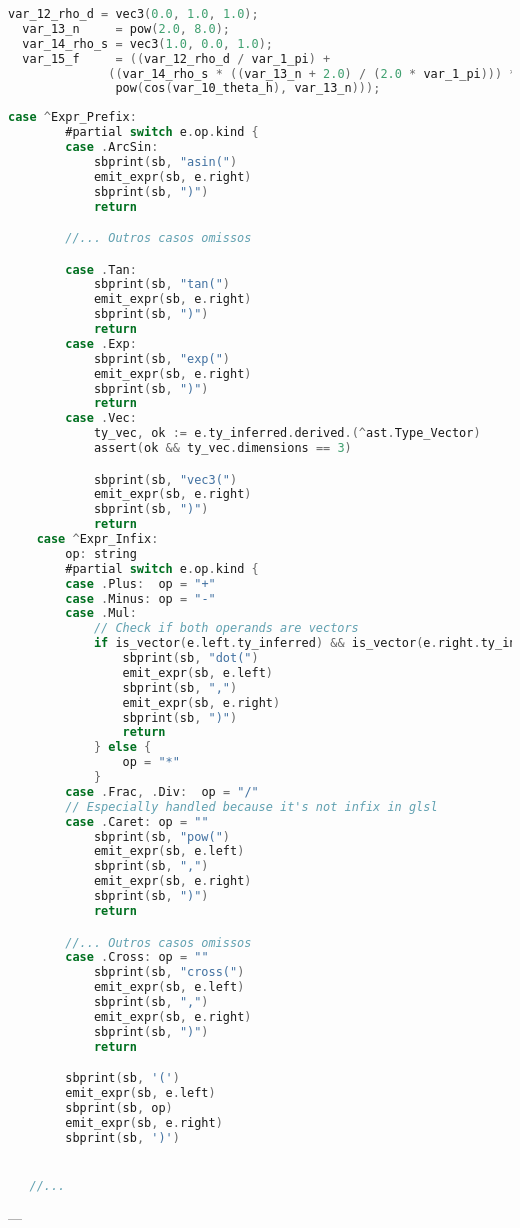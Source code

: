 \begin{codigo}[htb]
   \caption{\small Exemplo de código de expressão gerado. }
   \label{cod-emit-expr-example}
\begin{lstlisting}[language=C, frame=none, inputencoding=utf8]
  var_12_rho_d = vec3(0.0, 1.0, 1.0);
  var_13_n     = pow(2.0, 8.0);
  var_14_rho_s = vec3(1.0, 0.0, 1.0);
  var_15_f     = ((var_12_rho_d / var_1_pi) +
              ((var_14_rho_s * ((var_13_n + 2.0) / (2.0 * var_1_pi))) *
               pow(cos(var_10_theta_h), var_13_n)));
\end{lstlisting}
\end{codigo}

\begin{codigo}[htb]
   \caption{\small Emitir expressão. }
   \label{cod-emit-expr}
\begin{lstlisting}[language=C, frame=none, inputencoding=utf8]
    case ^Expr_Prefix:
        #partial switch e.op.kind {
        case .ArcSin:
            sbprint(sb, "asin(")
            emit_expr(sb, e.right)
            sbprint(sb, ")")
            return

        //... Outros casos omissos

        case .Tan:
            sbprint(sb, "tan(")
            emit_expr(sb, e.right)
            sbprint(sb, ")")
            return
        case .Exp:
            sbprint(sb, "exp(")
            emit_expr(sb, e.right)
            sbprint(sb, ")")
            return
        case .Vec:
            ty_vec, ok := e.ty_inferred.derived.(^ast.Type_Vector)
            assert(ok && ty_vec.dimensions == 3)

            sbprint(sb, "vec3(")
            emit_expr(sb, e.right)
            sbprint(sb, ")")
            return
    case ^Expr_Infix:
        op: string
        #partial switch e.op.kind {
        case .Plus:  op = "+"
        case .Minus: op = "-"
        case .Mul:
            // Check if both operands are vectors
            if is_vector(e.left.ty_inferred) && is_vector(e.right.ty_inferred) {
                sbprint(sb, "dot(")
                emit_expr(sb, e.left)
                sbprint(sb, ",")
                emit_expr(sb, e.right)
                sbprint(sb, ")")
                return
            } else {
                op = "*"
            }
        case .Frac, .Div:  op = "/"
        // Especially handled because it's not infix in glsl
        case .Caret: op = ""
            sbprint(sb, "pow(")
            emit_expr(sb, e.left)
            sbprint(sb, ",")
            emit_expr(sb, e.right)
            sbprint(sb, ")")
            return

        //... Outros casos omissos
        case .Cross: op = ""
            sbprint(sb, "cross(")
            emit_expr(sb, e.left)
            sbprint(sb, ",")
            emit_expr(sb, e.right)
            sbprint(sb, ")")
            return

        sbprint(sb, '(')
        emit_expr(sb, e.left)
        sbprint(sb, op)
        emit_expr(sb, e.right)
        sbprint(sb, ')')


   //... 

\end{lstlisting}
\end{codigo}
---
